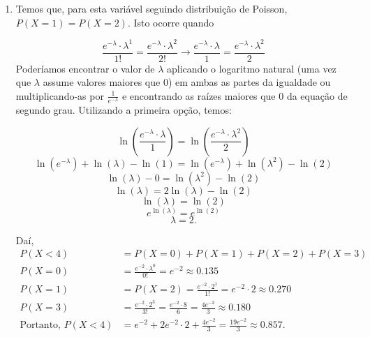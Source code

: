 \documentclass[
	12pt,				%
	openright,			%
	oneside,			%
	a4paper,			%
	english,			%
	brazil,				%
	]{abntex2}
\begin{document}
\begin{enumerate}[label=\alph*)]
    \item Temos que, para esta variável seguindo distribuição de Poisson,\\ $P(X=1) = P(X=2)$. Isto ocorre quando
    
    $$\frac{e^{-\lambda} \cdot \lambda^1}{1!} = \frac{e^{-\lambda} \cdot \lambda^2}{2!} \to \frac{e^{-\lambda} \cdot \lambda}{1} = \frac{e^{-\lambda} \cdot \lambda^2}{2}$$
    Poderíamos encontrar o valor de $\lambda$ aplicando o logaritmo natural (uma vez que $\lambda$ assume valores maiores que $0$) em ambas as partes da igualdade ou multiplicando-as por $\frac{1}{e^{-\lambda}}$ e encontrando as raízes maiores que 0 da equação de segundo grau.
    Utilizando a primeira opção\footnotemark, temos:
    
    
    $$\ln{\left(\frac{e^{-\lambda} \cdot \lambda}{1}\right)} = \ln{\left(\frac{e^{-\lambda} \cdot \lambda^2}{2}\right)}$$
    $$\ln{(e^{-\lambda})} + \ln{(\lambda)} - \ln{(1)} = \ln{(e^{-\lambda})} + \ln{(\lambda^2)} - \ln{(2)}$$
    $$\ln{(\lambda)} - 0 = \ln{(\lambda^2)} - \ln{(2)}$$
    $$\ln{(\lambda)} = 2\ln{(\lambda)} - \ln{(2)}$$
    $$\ln{(\lambda)} = \ln{(2)}$$
    $$e^{\ln{(\lambda)}} = e^{\ln{(2)}}$$
    $$\lambda = 2.$$
    
    Daí,
    \begin{align*}
        P(X < 4) &= P(X = 0) + P(X = 1) + P(X = 2) + P(X = 3)\\
        P(X = 0) &= \frac{e^{-2} \cdot \lambda^0}{0!} = e^{-2} \approx 0.135\\
        P(X = 1) &= P(X = 2) = \frac{e^{-2} \cdot 2^1}{1!} = e^{-2} \cdot 2 \approx 0.270\\
        P(X = 3) &= \frac{{e^{-2} \cdot 2^3}}{3!} = \frac{e^{-2} \cdot 8}{6} = \frac{4e^{-2}}{3} \approx 0.180\\
        \text{Portanto, } P(X < 4) &= e^{-2} + 2e^{-2} \cdot 2 + \frac{4e^{-2}}{3} = \frac{19e^{-2}}{3} \approx 0.857.
    \end{align*}
    

\end{enumerate}
\end{document}
